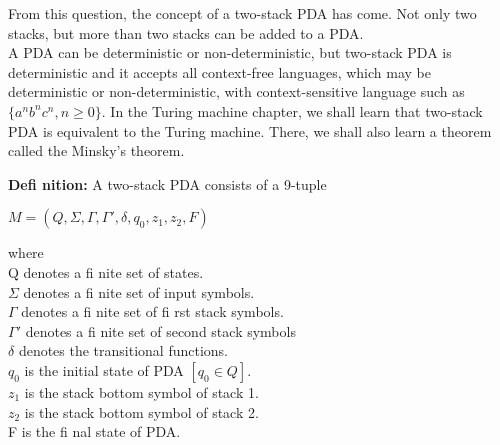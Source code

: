 \documentclass[9pt]{beamer}
\begin{document}
\begin{frame}
\hspace*{0.5cm} From this question, the concept of a two-stack PDA has come. Not only two stacks, but more than
two stacks can be added to a PDA.\\
\hspace*{0.5cm} A PDA can be deterministic or non-deterministic, but two-stack PDA is deterministic and it accepts
all context-free languages, which may be deterministic or non-deterministic, with context-sensitive language
such as $\{a^nb^n c^n, n \geq 0\}$. In the Turing machine chapter, we shall learn that two-stack PDA is
equivalent to the Turing machine. There, we shall also learn a theorem called the Minsky's theorem.

\vspace*{0.3cm}
\textbf{Defi nition:} A two-stack PDA consists of a 9-tuple\\

\begin{center}
  $M = (Q, \Sigma, \Gamma, \Gamma', \delta, q_0, z_1, z_2, F)$ \\
\end{center}

\end{frame}

\begin{frame}
where\\
\hspace*{1cm} Q denotes a fi nite set of states.\\
\hspace*{1cm} $\Sigma$ denotes a fi nite set of input symbols.\\
\hspace*{1cm} $\Gamma$ denotes a fi nite set of fi rst stack symbols.\\
\hspace*{1cm} $\Gamma '$ denotes a fi nite set of second stack symbols\\
\hspace*{1cm} $\delta$ denotes the transitional functions.\\
\hspace*{1cm} $q_0$ is the initial state of PDA $[q_0 \in Q]$.\\
\hspace*{1cm} $z_1$ is the stack bottom symbol of stack 1.\\
\hspace*{1cm} $z_2$ is the stack bottom symbol of stack 2.\\
\hspace*{1cm} F is the fi nal state of PDA.\\
\end{frame}
\end{document}
